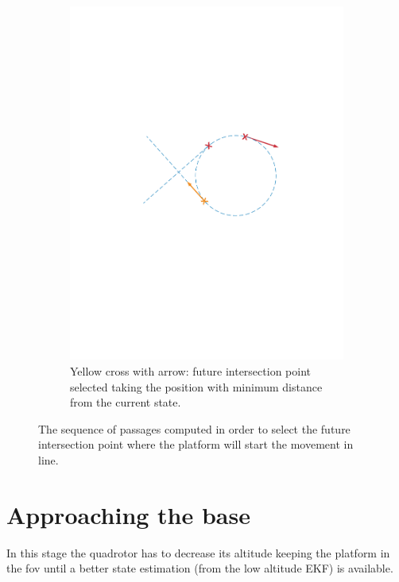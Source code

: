 \begin{figure}[!htbp]
    \begin{subfigure}[b]{0.45\textwidth}
        \includegraphics[width=\textwidth]{img/intersection_5.pdf}
        \caption{Yellow cross with arrow: future intersection point selected taking the position with minimum distance from the current state. }
        \label{fig:five}
   \end{subfigure}
  \caption{The sequence of passages computed in order to select the future intersection point where the platform will start the movement in line.}
  \label{fig:sequence_find_next_intersection}
\end{figure} 



\section{Approaching the base}
In this stage the quadrotor has to decrease its altitude keeping the platform in the fov until a better state estimation (from the low altitude EKF) is available.\\

